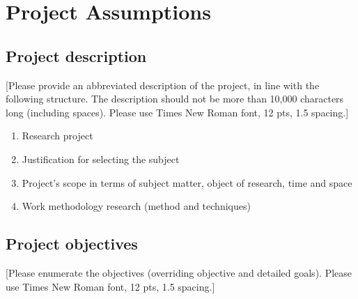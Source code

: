 \chapter{Project Assumptions}\label{ch:project-assumptions}


\section{Project description}\label{sec:project-description}
[Please provide an abbreviated description of the project, in line with the following structure.
The description should not be more than 10,000 characters long (including spaces).
Please use Times New Roman font, 12 pts, 1.5 spacing.]
\begin{enumerate}
    \item Research project
    \item Justification for selecting the subject
    \item Project's scope in terms of subject matter, object of research, time and space
    \item Work methodology research (method and techniques)
\end{enumerate}


\section{Project objectives}\label{sec:project-objectives}
[Please enumerate the objectives (overriding objective and detailed goals).
Please use Times New Roman font, 12 pts, 1.5 spacing.]